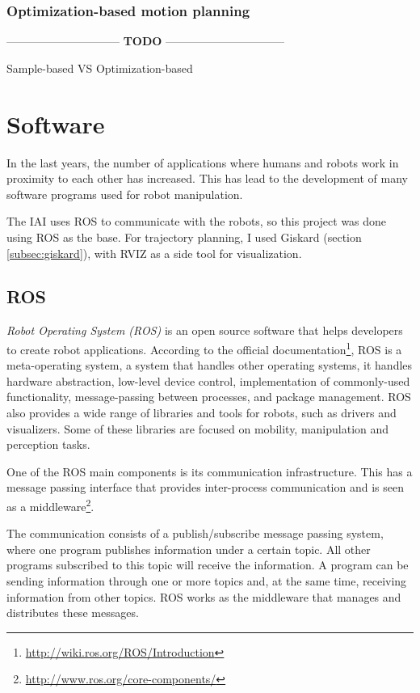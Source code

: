 \subsubsection{Optimization-based motion planning}

------------------------------ \textbf{TODO} --------------------------------

Sample-based VS Optimization-based

\section{Software}
In the last years, the number of applications where humans and robots work in proximity to each other has increased. This has lead to the development of many software programs used for robot manipulation. 

The IAI uses ROS to communicate with the robots, so this project was done using ROS as the base. For trajectory planning, I used Giskard (section \ref{subsec:giskard}), with RVIZ as a side tool for visualization.

\subsection{ROS}

\textit{Robot Operating System (ROS)} is an open source software that helps developers to create robot applications. According to the official documentation\footnote{\url{http://wiki.ros.org/ROS/Introduction}}, ROS is a meta-operating system, a system that handles other operating systems, it handles hardware abstraction, low-level device control, implementation of commonly-used functionality, message-passing between processes, and package management. ROS also provides a wide range of libraries and tools for robots, such as drivers and visualizers. Some of these libraries are focused on mobility, manipulation and perception tasks.

One of the ROS main components is its communication infrastructure. This has a message passing interface that provides inter-process communication and is seen as a middleware\footnote{\url{http://www.ros.org/core-components/}}. 

The communication consists of a publish/subscribe message passing system, where one program publishes information under a certain topic. All other programs subscribed to this topic will receive the information. A program can be sending information through one or more topics and, at the same time, receiving information from other topics. ROS works as the middleware that manages and distributes these messages.

